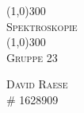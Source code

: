 \begin{titlepage}
  
  \begin{center}
    \line(1,0){300}\\
    [0.25in]
    \textsc{\Huge{Spektroskopie}}\\
    [3mm]
    \line(1,0){300}\\
    [1in]
    \textsc{\Large{Gruppe 23}}\\


    \begin{flushright}
      \textsc{David Raese\\
      \# 1628909}
    \end{flushright}
  \end{center}
\end{titlepage}
